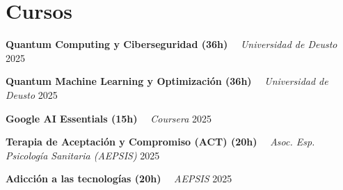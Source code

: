 \documentclass[letterpaper,11pt]{article}
\begin{document}
\section{Cursos}
    \noindent
    \begin{minipage}[t]{1.0\linewidth}
        {\textbf{Quantum Computing y Ciberseguridad (36h)}} 
        \ \textendash \ 
        {\color{detailgray}\textit{Universidad de Deusto}}
        \hfill 
        {\small 2025}
    \end{minipage}
    \par 
    \vspace{0.1cm} 
    \noindent
    \begin{minipage}[t]{1.0\linewidth}
        {\textbf{Quantum Machine Learning y Optimización (36h)}} 
        \ \textendash \ 
        {\color{detailgray}\textit{Universidad de Deusto}}
        \hfill 
        {\small 2025}
    \end{minipage}
    \par 
    \vspace{0.1cm} 
    \noindent
    \begin{minipage}[t]{1.0\linewidth}
        {\textbf{Google AI Essentials (15h)}} 
        \ \textendash \ 
        {\color{detailgray}\textit{Coursera}}
        \hfill 
        {\small 2025}
    \end{minipage}
    \par 
    \vspace{0.1cm} 
    \noindent
    \begin{minipage}[t]{1.0\linewidth}
        {\textbf{Terapia de Aceptación y Compromiso (ACT) (20h)}} 
        \ \textendash \ 
        {\color{detailgray}\textit{Asoc. Esp. Psicología Sanitaria (AEPSIS)}}
        \hfill 
        {\small 2025}
    \end{minipage}
    \par 
    \vspace{0.1cm} 
    \noindent
    \begin{minipage}[t]{1.0\linewidth}
        {\textbf{Adicción a las tecnologías (20h)}} 
        \ \textendash \ 
        {\color{detailgray}\textit{AEPSIS}}
        \hfill 
        {\small 2025}
    \end{minipage}
\end{document}
